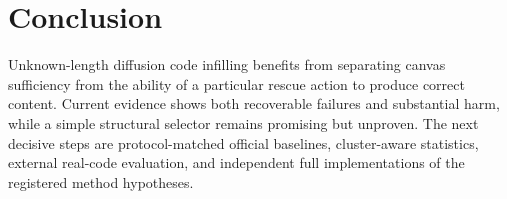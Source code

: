 \section{Conclusion}
Unknown-length diffusion code infilling benefits from separating canvas sufficiency from the ability of a particular rescue action to produce correct content. Current evidence shows both recoverable failures and substantial harm, while a simple structural selector remains promising but unproven. The next decisive steps are protocol-matched official baselines, cluster-aware statistics, external real-code evaluation, and independent full implementations of the registered method hypotheses.
